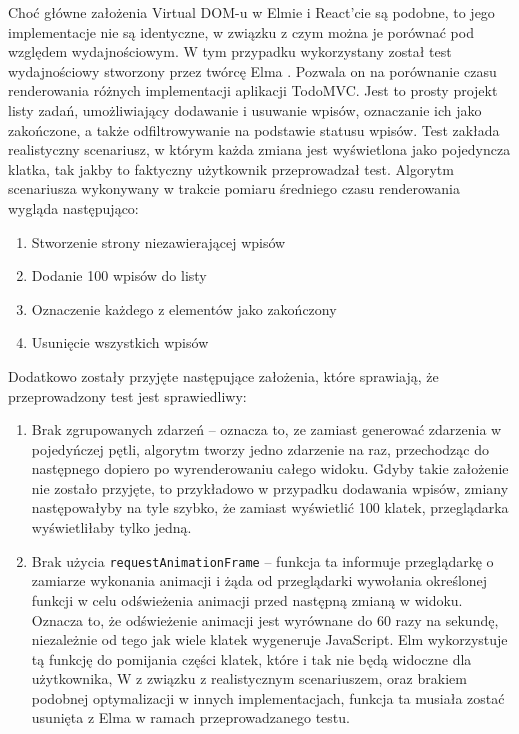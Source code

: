 Choć główne założenia Virtual DOM-u w Elmie i React'cie są podobne, to jego implementacje nie są identyczne, w związku z czym można je porównać pod względem wydajnościowym. W tym przypadku wykorzystany został test wydajnościowy stworzony przez twórcę Elma \cite{perComp}. Pozwala on na porównanie czasu renderowania różnych implementacji aplikacji TodoMVC. Jest to prosty projekt listy zadań, umożliwiający dodawanie i usuwanie wpisów, oznaczanie ich jako zakończone, a także odfiltrowywanie na podstawie statusu wpisów. Test zakłada realistyczny scenariusz, w którym każda zmiana jest wyświetlona jako pojedyncza klatka, tak jakby to faktyczny użytkownik przeprowadzał test. Algorytm scenariusza wykonywany w trakcie pomiaru średniego czasu renderowania wygląda następująco:
\begin{enumerate}
	\item Stworzenie strony niezawierającej wpisów
	\item Dodanie 100 wpisów do listy
	\item Oznaczenie każdego z elementów jako zakończony
	\item Usunięcie wszystkich wpisów
\end{enumerate}
Dodatkowo zostały przyjęte następujące założenia, które sprawiają, że przeprowadzony test jest sprawiedliwy:
\begin{enumerate}
	\item Brak zgrupowanych zdarzeń -- oznacza to, ze zamiast generować zdarzenia w pojedyńczej pętli, algorytm tworzy jedno zdarzenie na raz, przechodząc do następnego dopiero po wyrenderowaniu całego widoku. Gdyby takie założenie nie zostało przyjęte, to przykładowo w przypadku dodawania wpisów, zmiany następowałyby na tyle szybko, że zamiast wyświetlić 100 klatek, przeglądarka wyświetliłaby tylko jedną.
	\item Brak użycia \lstinline{requestAnimationFrame} -- funkcja ta informuje przeglądarkę o zamiarze wykonania animacji i żąda od przeglądarki wywołania określonej funkcji w celu odświeżenia animacji przed następną zmianą w widoku. Oznacza to, że odświeżenie animacji jest wyrównane do 60 razy na sekundę, niezależnie od tego jak wiele klatek wygeneruje JavaScript. Elm wykorzystuje tą funkcję do pomijania części klatek, które i tak nie będą widoczne dla użytkownika, W z związku z realistycznym scenariuszem, oraz brakiem podobnej optymalizacji w innych implementacjach, funkcja ta musiała zostać usunięta z Elma w ramach przeprowadzanego testu.
\end{enumerate}

